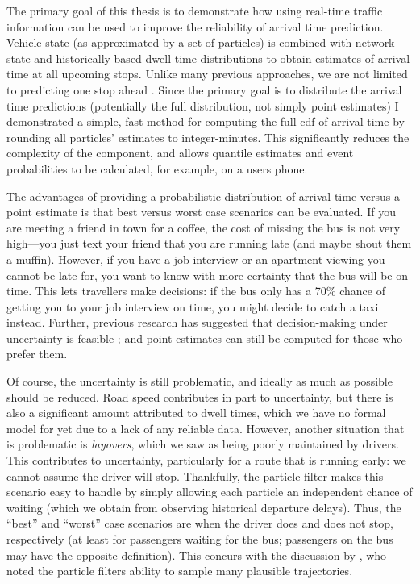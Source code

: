 The primary goal of this thesis is to demonstrate how using real-time traffic information can be used to improve the reliability of arrival time prediction. Vehicle state (as approximated by a set of particles) is combined with network state and historically-based dwell-time distributions to obtain estimates of arrival time at all upcoming stops. Unlike many previous approaches, we are not limited to predicting one stop ahead \citep{Yu_2011}. Since the primary goal is to distribute the arrival time predictions (potentially the full distribution, not simply point estimates) I demonstrated a simple, fast method for computing the full \gls{cdf} of arrival time by rounding all particles' estimates to integer-minutes. This significantly reduces the complexity of the component, and allows quantile estimates and event probabilities to be calculated, for example, on a users phone.


The advantages of providing a probabilistic distribution of arrival time versus a point estimate is that best versus worst case scenarios can be evaluated. If you are meeting a friend in town for a coffee, the cost of missing the bus is not very high---you just text your friend that you are running late (and maybe shout them a muffin). However, if you have a job interview or an apartment viewing you cannot be late for, you want to know with more certainty that the bus will be on time. This lets travellers make decisions: if the bus only has a 70\% chance of getting you to your job interview on time, you might decide to catch a taxi instead. Further, previous research has suggested that decision-making under uncertainty is feasible \citep{Fernandes_2018}; and point estimates can still be computed for those who prefer them.


Of course, the uncertainty is still problematic, and ideally as much as possible should be reduced. Road speed contributes in part to uncertainty, but there is also a significant amount attributed to dwell times, which we have no formal model for yet due to a lack of any reliable data. However, another situation that is problematic is \emph{layovers}, which we saw as being poorly maintained by drivers. This contributes to uncertainty, particularly for a route that is running early: we cannot assume the driver will stop. Thankfully, the particle filter makes this scenario easy to handle by simply allowing each particle an independent chance of waiting (which we obtain from observing historical departure delays). Thus, the ``best'' and ``worst'' case scenarios are when the driver does and does not stop, respectively (at least for passengers waiting for the bus; passengers on the bus may have the opposite definition). This concurs with the discussion by \citet{Hans_2015}, who noted the particle filters ability to sample many plausible trajectories.


